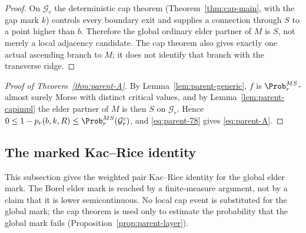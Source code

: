 \begin{proof}
On $\mathcal G_r$ the deterministic cap theorem (Theorem~\ref{thm:cap-main}, with the gap mark $k$) controls every boundary exit and supplies a connection through $S$ to a point higher than $b$. Therefore the global ordinary elder partner of $M$ is $S$, not merely a local adjacency candidate. The cap theorem also gives exactly one actual ascending branch to $M$; it does not identify that branch with the transverse ridge.
\end{proof}

\begin{proof}[Proof of Theorem~\ref{thm:parent-A}]
By Lemma~\ref{lem:parent-generic}, $f$ is $\Prob^{MS}_r$-almost surely Morse with distinct critical values, and by Lemma~\ref{lem:parent-capimpl} the elder partner of $M$ is then $S$ on $\mathcal G_r$. Hence $0\le1-p_r(b,k,R)\le\Prob^{MS}_r(\mathcal G_r^c)$, and \eqref{eq:parent-78} gives \eqref{eq:parent-A}.
\end{proof}

\subsection{The marked Kac--Rice identity}\label{ssec:parent-KR}

This subsection gives the weighted pair Kac--Rice identity for the global elder mark. The Borel elder mark is reached by a finite-measure argument, not by a claim that it is lower semicontinuous. No local cap event is substituted for the global mark; the cap theorem is used only to estimate the probability that the global mark fails (Proposition~\ref{prop:parent-layer}).

